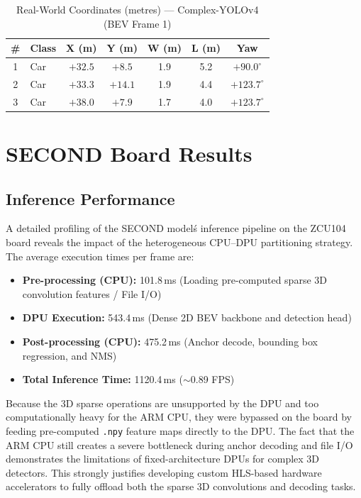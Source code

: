 \documentclass[12pt, a4paper]{report}
\begin{document}
\begin{table}[H]
\centering
\caption{Real-World Coordinates (metres) --- Complex-YOLOv4 (BEV Frame 1)}
\label{tab:cyolo_realworld}
\begin{tabular}{@{}clccccc@{}}
\toprule
\textbf{\#} & \textbf{Class} & \textbf{X (m)} & \textbf{Y (m)} & \textbf{W (m)} & \textbf{L (m)} & \textbf{Yaw} \\
\midrule
1 & Car & $+32.5$ & $+8.5$ & 1.9 & 5.2 & $+90.0^\circ$ \\
2 & Car & $+33.3$ & $+14.1$ & 1.9 & 4.4 & $+123.7^\circ$ \\
3 & Car & $+38.0$ & $+7.9$ & 1.7 & 4.0 & $+123.7^\circ$ \\
\bottomrule
\end{tabular}
\end{table}

\section{SECOND Board Results}

\subsection{Inference Performance}

A detailed profiling of the SECOND model\'s inference pipeline on the ZCU104 board reveals the impact of the heterogeneous CPU--DPU partitioning strategy. The average execution times per frame are:

\begin{itemize}[nosep]
    \item \textbf{Pre-processing (CPU):} 101.8\,ms (Loading pre-computed sparse 3D convolution features / File I/O)
    \item \textbf{DPU Execution:} 543.4\,ms (Dense 2D BEV backbone and detection head)
    \item \textbf{Post-processing (CPU):} 475.2\,ms (Anchor decode, bounding box regression, and NMS)
    \item \textbf{Total Inference Time:} 1120.4\,ms ($\sim$0.89 FPS)
\end{itemize}

Because the 3D sparse operations are unsupported by the DPU and too computationally heavy for the ARM CPU, they were bypassed on the board by feeding pre-computed \texttt{.npy} feature maps directly to the DPU. The fact that the ARM CPU still creates a severe bottleneck during anchor decoding and file I/O demonstrates the limitations of fixed-architecture DPUs for complex 3D detectors. This strongly justifies developing custom HLS-based hardware accelerators to fully offload both the sparse 3D convolutions and decoding tasks.
\end{document}
